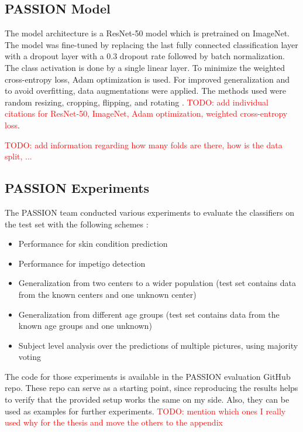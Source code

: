 \documentclass[12pt, a4paper, oneside]{book}   	%
\renewcommand{\todo}[1]{\textcolor{red}{TODO: #1}}
\begin{document}
			\subsection{PASSION Model}
			  The model architecture is a ResNet-50 model which is pretrained on ImageNet. The model was fine-tuned by replacing the last fully connected classification layer with a dropout layer with a 0.3 dropout rate followed by batch normalization. The class activation is done by a single linear layer. To minimize the weighted cross-entropy loss, Adam optimization is used. For improved generalization and to avoid overfitting, data augmentations were applied. The methods used were random resizing, cropping, flipping, and rotating \textcite{Gottfrois2024}. \todo{add individual citations for ResNet-50, ImageNet, Adam optimization, weighted cross-entropy loss}.
			  
			  \todo{add information regarding how many folds are there, how is the data split, ...}
			  			
			\subsection{PASSION Experiments}
			  The PASSION team conducted various experiments to evaluate the classifiers on the test set with the following schemes \autocite{Gottfrois2024}:
			  \begin{itemize}
			  	\item Performance for skin condition prediction
			  	\item Performance for impetigo detection
			  	\item Generalization from two centers to a wider population (test set contains data from the known centers and one unknown center)
			  	\item Generalization from different age groups (test set contains data from the known age groups and one unknown)
			  	\item Subject level analysis over the predictions of multiple pictures, using majority voting
			  \end{itemize}
			  
			  The code for those experiments is available in the PASSION evaluation GitHub repo. These repo can serve as a starting point, since reproducing the results helps to verify that the provided setup works the same on my side. Also, they can be used as examples for further experiments. \todo{mention which ones I really used why for the thesis and move the others to the appendix}
			  
\end{document}
